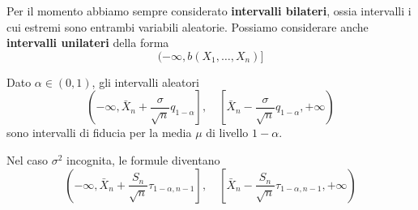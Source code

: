 Per il momento abbiamo sempre considerato \textbf{intervalli bilateri}, ossia intervalli i cui
estremi sono entrambi variabili aleatorie. Possiamo considerare anche \textbf{intervalli unilateri}
della forma
\[ (-\infty, b(X_1, \dots, X_n)] \]

\begin{proposition}
	Dato $\alpha \in (0,1)$, gli intervalli aleatori
	\[
		\left( \left. -\infty, \bar{X}_n + \frac{\sigma}{\sqrt{n}} q_{1-\alpha} \right] \right.,
		\quad
		\left[ \bar{X}_n - \frac{\sigma}{\sqrt{n}} q_{1-\alpha}, +\infty \right)
	\]
	sono intervalli di fiducia per la media $\mu$ di livello $1-\alpha$.
\end{proposition}

Nel caso $\sigma^2$ incognita, le formule diventano
\[
	\left( \left. -\infty, \bar{X}_n +
	\frac{S_n}{\sqrt{n}} \tau_{1-\alpha, n-1} \right] \right., \quad
	\left[ \left. \bar{X}_n - \frac{S_n}{\sqrt{n}}
	\tau_{1-\alpha, n-1}, +\infty \right) \right.
\]